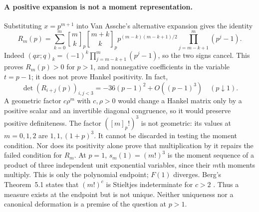 \documentclass[11pt]{article}
\begin{document}
\paragraph{A positive expansion is not a moment representation.}
Substituting $x=p^{m+1}$ into Van Assche's alternative expansion
\cite[(16), p.~4]{vanassche2001} gives the identity
\[
 R_m(p)=\sum_{k=0}^m\genfrac{[}{]}{0pt}{}{m}{k}_p\genfrac{[}{]}{0pt}{}{m+k}{k}_p
 p^{(m-k)(m-k+1)/2}\prod_{j=m-k+1}^{m}(p^j-1).
\]
Indeed $(qx;q)_k=(-1)^k\prod_{j=m-k+1}^m(p^j-1)$, so the two signs cancel.
This proves $R_m(p)>0$ for $p>1$, and nonnegative coefficients in the
variable $t=p-1$; it does not prove Hankel positivity. In fact,
\[
 \det(R_{i+j}(p))_{i,j<3}=-36(p-1)^2+O((p-1)^3)
 \quad(p\downarrow1).
\]
A geometric factor $c\rho^m$ with $c,\rho>0$ would change a Hankel
matrix only by a positive scalar and an invertible diagonal congruence,
so it would preserve positive definiteness. The factor $([m]_p!)^3$
is not geometric: its values at $m=0,1,2$ are $1,1,(1+p)^3$.
It cannot be discarded in testing the moment condition. Nor does its
positivity alone prove that multiplication by it repairs the failed
condition for $R_m$. At $p=1$, $s_m(1)=(m!)^3$ is the moment sequence of a
product of three independent unit exponential variables, since their
$m$th moments multiply. This is only the polynomial endpoint; $F(1)$
diverges. Berg's Theorem~5.1 states that $(m!)^c$ is Stieltjes indeterminate
for $c>2$ \cite{berg2007}. Thus a measure exists at the endpoint but is not
unique. Neither uniqueness nor a canonical deformation is a premise of
the question at $p>1$.
\end{document}
